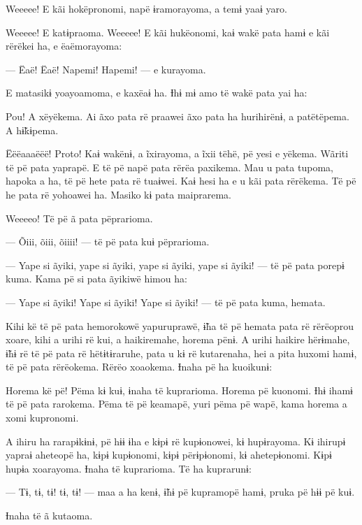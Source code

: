 Weeeee! E kãi hokëpronomi, napë ɨramorayoma, a temɨ yaaɨ yaro. 

Weeeee! E katɨpraoma. Weeeee! E kãi hukëonomi, kaɨ wakë pata hamɨ e kãi
rërëkei ha, e ëaëmorayoma:

--- Ëaë! Ëaë! Napemi! Hapemi! --- e kurayoma. 

E matasikɨ yoayoamoma, e kaxëaɨ ha. Ɨhɨ mɨ amo të wakë pata yai ha: 

Pou! A xëyëkema. Ai ãxo pata rë praawei ãxo pata ha hurihirënɨ, a
patëtëpema. A hɨ̃kɨpema. 

Ëëëaaaëëë! Proto! Kaɨ wakënɨ, a ĩxirayoma, a ĩxii tëhë, pë yesi e
yëkema. Wãriti të pë pata yaprapë. E të pë napë pata rërëa paxikema. Mau
u pata tupoma, hapoka a ha, të pë hete pata rë tuaɨwei. Kaɨ hesi ha e u
kãi pata rërëkema. Të pë he pata rë yohoawei ha. Masiko kɨ pata
maiprarema. 

Weeeeo! Të pë ã pata pëprarioma. 

--- Õiii, õiii, õiiii! --- të pë pata kuɨ pëprarioma.

--- Yape si ãyiki, yape si ãyiki, yape si ãyiki, yape si ãyiki! --- të
pë pata porepɨ kuma. Kama pë si pata ãyikiwë himou ha: 

--- Yape si ãyiki! Yape si ãyiki! Yape si ãyiki! --- të pë pata kuma,
hemata. 

Kihi kë të pë pata hemorokowë yapuruprawë, ɨ̃ha të pë hemata pata rë
rërëoprou xoare, kihi a urihi rë kui, a haikiremahe, horema pënɨ. A urihi haikire hërɨmahe, ɨ̃hɨ rë të pë pata rë hëtɨtɨraruhe, pata u kɨ rë
kutarenaha, hei a pita huxomi hamɨ, të pë pata rërëokema. Rërëo
xoaokema. Ɨnaha pë ha kuoikunɨ: 

Horema kë pë! Pëma kɨ kuɨ, ɨnaha të kuprarioma. Horema pë kuonomi. Ɨhɨ
ihamɨ të pë pata rarokema. Pëma të pë keamapë, yuri pëma pë wapë, kama
horema a xomi kupronomi. 

A ihiru ha rarapɨkɨnɨ, pë hɨɨ ɨha e kɨpɨ rë kupɨonowei, kɨ hupɨrayoma.
Kɨ ihirupɨ yapraɨ aheteopë ha, kɨpɨ kupɨonomi, kɨpɨ përɨpɨonomi, kɨ
ahetepɨonomi. Kɨpɨ hupɨa xoarayoma. Ɨnaha të kuprarioma. Të ha
kuprarunɨ: 

--- Tɨ, tɨ, tɨ! tɨ, tɨ! --- maa a ha kenɨ, ɨ̃hɨ pë kupramopë hamɨ, pruka
pë hɨɨ pë kuɨ. 

Ɨnaha të ã kutaoma.

 
